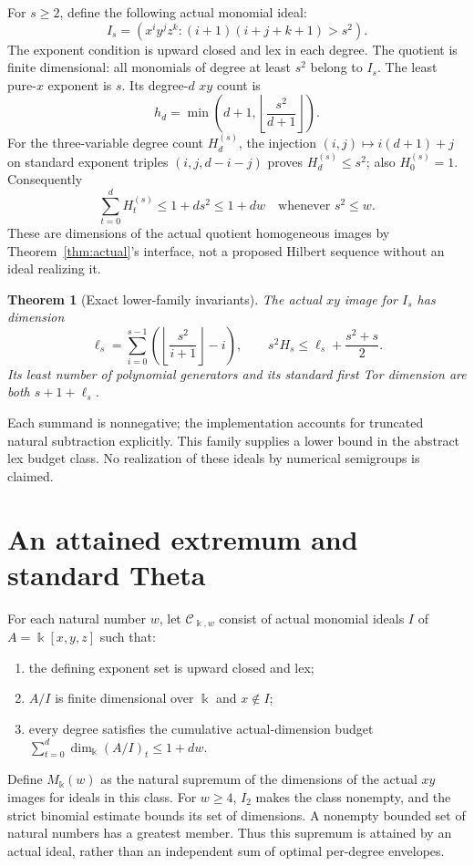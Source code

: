 \documentclass[11pt,a4paper]{article}
\newtheorem{theorem}{Theorem}[section]
\newcommand{\kk}{\Bbbk}
\begin{document}
For $s\ge2$, define the following actual monomial ideal:
\[
 I_s=(x^iy^jz^k:(i+1)(i+j+k+1)>s^2).
\]
The exponent condition is upward closed and lex in each degree. The quotient
is finite dimensional: all monomials of degree at least $s^2$ belong to $I_s$.
The least pure-$x$ exponent is $s$. Its degree-$d$ $xy$ count is
\[
 h_d=\min\left(d+1,\left\lfloor\frac{s^2}{d+1}\right\rfloor\right).
\]
For the three-variable degree count $H^{(s)}_d$, the injection
$(i,j)\mapsto i(d+1)+j$ on standard exponent triples $(i,j,d-i-j)$
proves $H^{(s)}_d\le s^2$; also $H^{(s)}_0=1$. Consequently
\[
 \sum_{t=0}^{d}H^{(s)}_t\le1+ds^2\le1+dw
 \quad\text{whenever }s^2\le w.
\]
These are dimensions of the actual quotient homogeneous images by
Theorem~\ref{thm:actual}'s interface, not a proposed Hilbert sequence without
an ideal realizing it.

\begin{theorem}[Exact lower-family invariants]\label{thm:lower}
The actual $xy$ image for $I_s$ has dimension
\[
 \ell_s=\sum_{i=0}^{s-1}
 \left(\left\lfloor\frac{s^2}{i+1}\right\rfloor-i\right),\qquad
 s^2H_s\le\ell_s+\frac{s^2+s}{2}.
\]
Its least number of polynomial generators and its standard first Tor dimension
are both $s+1+\ell_s$.
\end{theorem}
Each summand is nonnegative; the implementation accounts for truncated natural
subtraction explicitly. This family supplies a lower bound in the abstract
lex budget class. No realization of these ideals by numerical semigroups is
claimed.

\section{An attained extremum and standard Theta}\label{sec:theta}
For each natural number $w$, let $\mathcal C_{\kk,w}$ consist of actual monomial
ideals $I$ of $A=\kk[x,y,z]$ such that:
\begin{enumerate}
\item the defining exponent set is upward closed and lex;
\item $A/I$ is finite dimensional over $\kk$ and $x\notin I$;
\item every degree satisfies the cumulative actual-dimension budget
$\sum_{t=0}^{d}\dim_{\kk}(A/I)_t\le1+dw$.
\end{enumerate}
Define $M_{\kk}(w)$ as the natural supremum of the dimensions of the actual
$xy$ images for ideals in this class. For $w\ge4$, $I_2$ makes the class nonempty,
and the strict binomial estimate bounds its set of dimensions. A nonempty
bounded set of natural numbers has a greatest member. Thus this supremum is
attained by an actual ideal, rather than an independent sum of optimal
per-degree envelopes.
\end{document}
